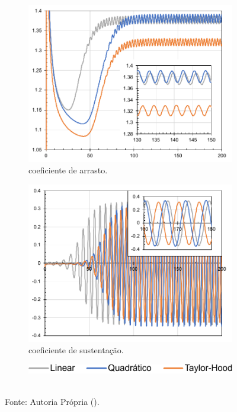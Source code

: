 \begin{figure}[h!]
    \centering
    \caption{Valores ao longo do tempo na simulação sem modelo de:}
    \begin{subfigure}{.49\textwidth}
        \centering
        \includegraphics[width=\linewidth]{Figuras/cylinder/analise2/none-drag.pdf}
        \caption{coeficiente de arrasto.}
    \end{subfigure}
    \begin{subfigure}{.49\textwidth}
        \centering
        \includegraphics[width=\linewidth]{Figuras/cylinder/analise2/none-lift.pdf}
        \caption{coeficiente de sustentação.}
    \end{subfigure}
    \begin{subfigure}{\textwidth}
        \centering
        \includegraphics[width=.4\linewidth]{Figuras/cylinder/analise2/legenda.pdf}
    \end{subfigure}
    \\Fonte: Autoria Própria (\the\year).
    \label{fig:cyl-draglift-None}
\end{figure}

